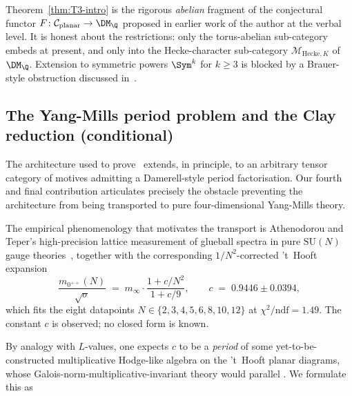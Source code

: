 Theorem~\ref{thm:T3-intro} is the rigorous \emph{abelian}
fragment of the conjectural functor $F \colon
\mathcal{C}_{\mathrm{planar}} \to \DM_\Q$ proposed in earlier work
of the author at the verbal level. It is honest about the
restrictions: only the torus-abelian sub-category embeds at
present, and only into the Hecke-character sub-category
$\mathcal{M}_{\mathrm{Hecke}, K}$ of $\DM_\Q$. Extension to
symmetric powers $\Sym^k$ for $k \geq 3$ is blocked by a Brauer-style
obstruction discussed in~.

\subsection{The Yang-Mills period problem and the Clay
reduction (conditional)}\label{ss:gap3-intro}
The architecture used to prove~ extends, in
principle, to an arbitrary tensor category of motives admitting
a Damerell-style period factorisation. Our fourth and final
contribution articulates precisely the obstacle preventing the
architecture from being transported to pure four-dimensional
Yang-Mills theory.

The empirical phenomenology that motivates the transport is
Athenodorou and Teper's high-precision lattice measurement of
glueball spectra in pure $\mathrm{SU}(N)$ gauge
theories~\cite{Athenodorou2021}, together with the corresponding
$1/N^2$-corrected 't~Hooft expansion~\cite{tHooft1974}
\begin{equation}\label{eq:F-N}
\frac{m_{0^{++}}(N)}{\sqrt{\sigma}} \;=\;
m_\infty \cdot \frac{1 + c/N^2}{1 + c/9},
\qquad c \;=\; 0.9446 \pm 0.0394,
\end{equation}
which fits the eight datapoints $N \in \{2,3,4,5,6,8,10,12\}$ at
$\chi^2/\mathrm{ndf} = 1.49$. The constant $c$ is observed; no
closed form is known.

By analogy with $L$-values, one expects $c$ to be a \emph{period}
of some yet-to-be-constructed multiplicative Hodge-like algebra on
the 't~Hooft planar diagrams, whose
Galois-norm-multiplicative-invariant theory would parallel
. We formulate this as

